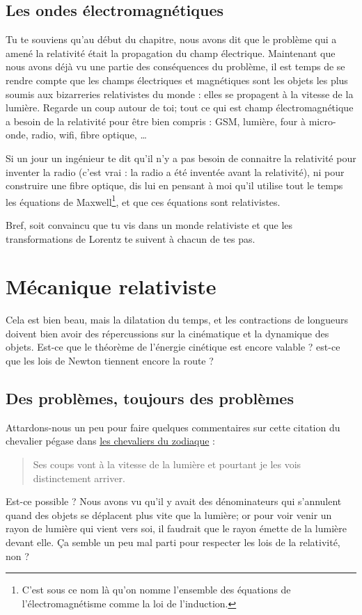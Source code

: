 \subsection{Les ondes électromagnétiques}

Tu te souviens qu'au début du chapitre, nous avons dit que le problème qui a amené la relativité était la propagation du champ électrique. Maintenant que nous avons déjà vu une partie des conséquences du problème, il est temps de se rendre compte que les champs électriques et magnétiques sont les objets les plus soumis aux bizarreries relativistes du monde : elles se propagent à la vitesse de la lumière. Regarde un coup autour de toi; tout ce qui est champ électromagnétique a besoin de la relativité pour être bien compris : GSM, lumière, four à micro-onde, radio, wifi, fibre optique, \ldots

Si un jour un ingénieur te dit qu'il n'y a pas besoin de connaitre la relativité pour inventer la radio (c'est vrai : la radio a été inventée avant la relativité), ni pour construire une fibre optique, dis lui en pensant à moi qu'il utilise tout le temps les équations de Maxwell\footnote{C'est sous ce nom là qu'on nomme l'ensemble des équations de l'électromagnétisme comme la loi de l'induction.}, et que ces équations sont relativistes.

Bref, soit convaincu que tu vis dans un monde relativiste et que les transformations de Lorentz te suivent à chacun de tes pas.

\section{Mécanique relativiste}

Cela est bien beau, mais la dilatation du temps, et les contractions de longueurs doivent bien avoir des répercussions sur la cinématique et la dynamique des objets. Est-ce que le théorème de l'énergie cinétique est encore valable ? est-ce que les lois de Newton tiennent encore la route ?


\subsection{Des problèmes, toujours des problèmes}


Attardons-nous un peu pour faire quelques commentaires sur cette citation du chevalier pégase dans \href{http://fr.wikipedia.org/wiki/Les_Chevaliers_du_Zodiaque}{les chevaliers du zodiaque} :
\begin{quote}
Ses coups vont à la vitesse de la lumière et pourtant je les vois distinctement arriver.
\end{quote}
Est-ce possible ? Nous avons vu qu'il y avait des dénominateurs qui s'annulent quand des objets se déplacent plus vite que la lumière; or pour voir venir un rayon de lumière qui vient vers soi, il faudrait que le rayon émette de la lumière devant elle. Ça semble un peu mal parti pour respecter les lois de la relativité, non ?

